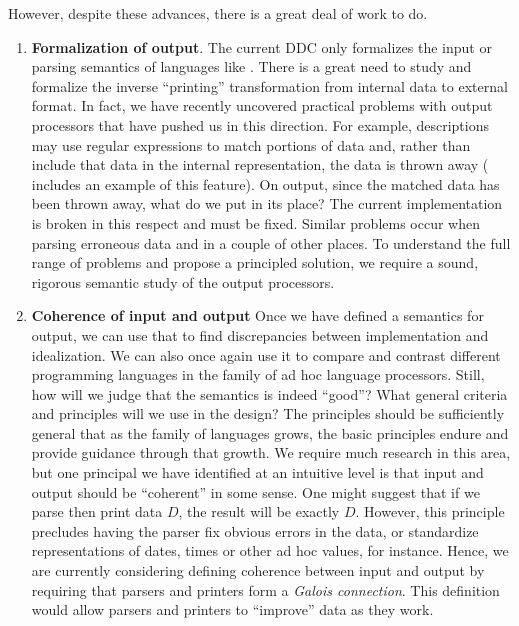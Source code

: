 \documentclass[11pt]{article}
\begin{document}
However, despite these advances, there is a great deal of work to do.

\begin{enumerate}
\item {\bf Formalization of output}.  The current DDC only formalizes the
input or parsing semantics of languages like \pads.  There is
a great need to study and formalize the inverse ``printing'' transformation 
from internal data to external format.  In fact, we have recently
uncovered practical problems with output processors that have pushed us in 
this direction. For example, \pads{} descriptions may use regular expressions
to match portions of data and, rather than include that data in the
internal representation, the data is thrown away (
includes an example of this feature).  On output, since the matched
data has been thrown away, what do we put in its place?  The 
current implementation is broken in this respect and must be fixed.
Similar problems occur when parsing erroneous data and in a couple of other
places.  To understand the full range of problems and propose
a principled solution, we require a sound, rigorous semantic study
of the output processors.

\item {\bf Coherence of input and output}  Once we have defined a semantics
for output, we can use that to find discrepancies between implementation
and idealization.  We can also once again
use it to compare and contrast different programming languages
in the family of ad hoc language processors.  Still, 
how will we judge that the semantics is indeed ``good''?
What general criteria and principles will we use in the design?  The
principles should be sufficiently general that as the family of languages
grows, the basic principles endure and provide guidance through that 
growth.  We require much research in this area, but one principal
we have identified at an intuitive level is that input and output
should be ``coherent'' in some sense.  One might suggest that 
if we parse then print data $D$, the result will be exactly $D$.
However, this principle precludes having the parser fix obvious errors
in the data, or standardize representations of dates, times or other
ad hoc values, for instance.  Hence, we are currently considering
defining coherence between input and output
by requiring that parsers and printers form
a {\em Galois connection}.  This definition would allow parsers and printers to
``improve'' data as they work.  


\end{enumerate}
\end{document}
